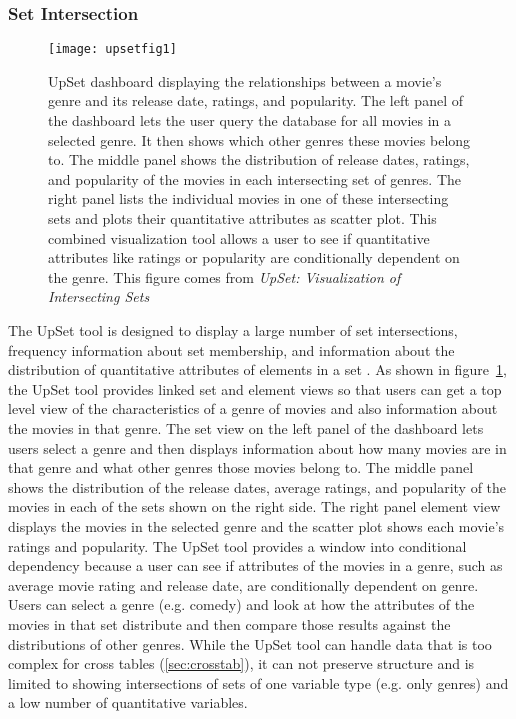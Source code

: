 \documentclass[../main.tex]{subfiles}
\begin{document}
 \subsubsection{Set Intersection}
 \label{sec:setintersection}
\begin{figure}[H]
  \texttt{[image: upsetfig1]}
   \caption{UpSet dashboard displaying the relationships between a movie's genre and its release date, ratings, and popularity. The left panel of the dashboard lets the user query the database for all movies in a selected genre. It then shows which other genres these movies belong to. The middle panel shows the distribution of release dates, ratings, and popularity of the movies in each intersecting set of genres. The right panel lists the individual movies in one of these intersecting sets and plots their quantitative attributes as scatter plot. This combined visualization tool allows a user to see if quantitative attributes like ratings or popularity are conditionally dependent on the genre. This figure comes from \textit{UpSet: Visualization of Intersecting Sets} \cite{lex_upset_2014}}
   \label{fig:upsetfig}
\end{figure}

The UpSet tool is designed to display a large number of set intersections, frequency information about set membership, and information about the distribution of quantitative attributes of elements in a set \cite{lex_upset_2014}. As shown in figure~\ref{fig:upsetfig}, the UpSet tool provides linked set and element views so that users can get a top level view of the characteristics of a genre of movies and also information about the movies in that genre. The set view on the left panel of the dashboard lets users select a genre and then displays information about how many movies are in that genre and what other genres those movies belong to. The middle panel shows the distribution of the release dates, average ratings, and popularity of the movies in each of the sets shown on the right side. The right panel element view displays the movies in the selected genre and the scatter plot shows each movie's ratings and popularity. The UpSet tool provides a window into conditional dependency because a user can see if attributes of the movies in a genre, such as average movie rating and release date, are conditionally dependent on genre. Users can select a genre (e.g. comedy) and look at how the attributes of the movies in that set distribute and then compare those results against the distributions of other genres. While the UpSet tool can handle data that is too complex for cross tables (\ref{sec:crosstab}), it can not preserve structure and is limited to showing intersections of sets of one variable type (e.g. only genres) and a low number of quantitative variables.  
\end{document}
